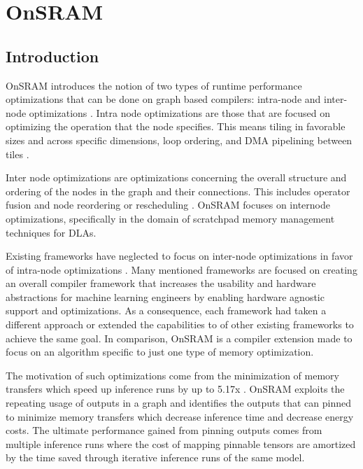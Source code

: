 
\chapter{OnSRAM} %

\label{Chapter3} %


\section{Introduction}

OnSRAM introduces the notion of two types of runtime performance optimizations
that can be done on graph based compilers: intra-node and inter-node
optimizations \cite{onsram}.  Intra node optimizations are those that are
focused on optimizing the operation that the node specifies. This means tiling
in favorable sizes and across specific dimensions, loop ordering, and DMA
pipelining between tiles \cite{aladdin}.

Inter node optimizations are optimizations concerning the overall structure and
ordering of the nodes in the graph and their connections. This includes
operator fusion and node reordering or rescheduling \cite{onsram}.
OnSRAM focuses on internode optimizations, specifically in the domain of
scratchpad memory management techniques for DLAs. 

Existing frameworks have neglected to focus on inter-node optimizations in favor
of intra-node optimizations \cite{TVM} \cite{deeptools} \cite{tensorflow}. Many 
mentioned frameworks are focused on creating an overall compiler framework that
increases the usability and hardware abstractions for machine learning engineers
by enabling hardware agnostic support and optimizations. As a consequence, each
framework had taken a different approach or extended the capabilities to of other
existing frameworks to achieve the same goal. In comparison, OnSRAM is a
compiler extension made to focus on an algorithm specific to just one type of
memory optimization.

The motivation of such optimizations come from the minimization of memory
transfers which speed up inference runs by up to 5.17x \cite{onsram}. OnSRAM
exploits the repeating usage of outputs in a graph and identifies the outputs
that can pinned to minimize memory transfers which decrease inference time and
decrease energy costs. The ultimate performance gained from pinning outputs comes from
multiple inference runs where the cost of mapping pinnable tensors are amortized by the
time saved through iterative inference runs of the same model.

